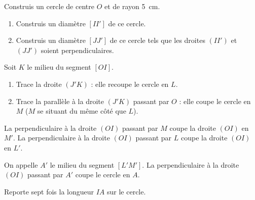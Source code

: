 \begin{myenumerate}
  \item Construis un cercle de centre $O$ et de rayon 5~cm.
  \item
    \begin{enumerate}
      \item Construis un diamètre $[II']$ de ce cercle.
      \item Construis un diamètre $[JJ']$ de ce cercle tels que les droites $(II')$ et $(JJ')$ soient perpendiculaires.
    \end{enumerate}
  \item Soit $K$ le milieu du segment $[OI]$.
    \begin{enumerate}
    \item Trace la droite $(J'K)$ : elle recoupe le cercle en $L$.
    \item Trace la parallèle à la droite $(J'K)$ passant par $O$ : elle coupe le cercle en $M$ ($M$ se situant du même côté que $L$).
    \end{enumerate}
  \item La perpendiculaire à la droite $(OI)$ passant par $M$ coupe la droite $(OI)$ en $M'$. La perpendiculaire à la droite $(OI)$ passant par $L$ coupe la droite $(OI)$ en $L'$.
  \item On appelle $A'$ le milieu du segment $[L'M']$. La perpendiculaire à la droite $(OI)$ passant par $A'$ coupe le cercle en $A$.
  \item Reporte sept fois la longueur $IA$ sur le cercle.
\end{myenumerate}